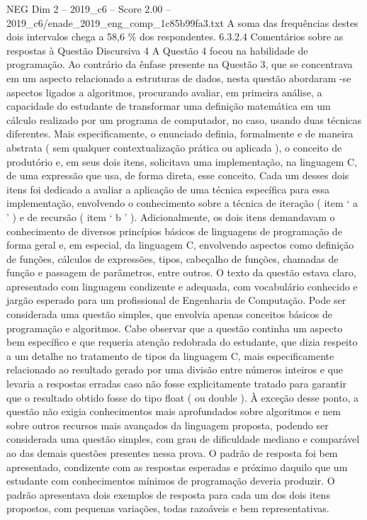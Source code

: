 \begin{textsample}{NEG Dim 2 – 2019\_c6 – Score 2.00 – 2019\_c6/enade\_2019\_eng\_comp\_1c85b99fa3.txt}
A soma das frequências destes dois intervalos chega a 58,6 \% dos respondentes. 6.3.2.4 Comentários sobre as respostas à Questão Discursiva 4 A Questão 4 focou na habilidade de programação.
Ao contrário da ênfase presente na Questão 3, que se concentrava em um aspecto relacionado a estruturas de dados, nesta questão abordaram -se aspectos ligados a algoritmos, procurando avaliar, em primeira análise, a capacidade do estudante de transformar uma definição matemática em um cálculo realizado por um programa de computador, no caso, usando duas técnicas diferentes.
Mais especificamente, o enunciado definia, formalmente e de maneira abstrata ( sem qualquer contextualização prática ou aplicada ), o conceito de produtório e, em seus dois itens, solicitava uma implementação, na linguagem C, de uma expressão que usa, de forma direta, esse conceito.
Cada um desses dois itens foi dedicado a avaliar a aplicação de uma técnica específica para essa implementação, envolvendo o conhecimento sobre a técnica de iteração ( item ‘ a ’ ) e de recursão ( item ‘ b ’ ).
Adicionalmente, os dois itens demandavam o conhecimento de diversos princípios básicos de linguagens de programação de forma geral e, em especial, da linguagem C, envolvendo aspectos como definição de funções, cálculos de expressões, tipos, cabeçalho de funções, chamadas de função e passagem de parâmetros, entre outros.
O texto da questão estava claro, apresentado com linguagem condizente e adequada, com vocabulário conhecido e jargão esperado para um profissional de Engenharia de Computação.
Pode ser considerada uma questão simples, que envolvia apenas conceitos básicos de programação e algoritmos.
Cabe observar que a questão continha um aspecto bem específico e que requeria atenção redobrada do estudante, que dizia respeito a um detalhe no tratamento de tipos da linguagem C, mais especificamente relacionado ao resultado gerado por uma divisão entre números inteiros e que levaria a respostas erradas caso não fosse explicitamente tratado para garantir que o resultado obtido fosse do tipo float ( ou double ).
À exceção desse ponto, a questão não exigia conhecimentos mais aprofundados sobre algoritmos e nem sobre outros recursos mais avançados da linguagem proposta, podendo ser considerada uma questão simples, com grau de dificuldade mediano e comparável ao das demais questões presentes nessa prova.
O padrão de resposta foi bem apresentado, condizente com as respostas esperadas e próximo daquilo que um estudante com conhecimentos mínimos de programação deveria produzir.
O padrão apresentava dois exemplos de resposta para cada um dos dois itens propostos, com pequenas variações, todas razoáveis e bem representativas.

\end{textsample}
